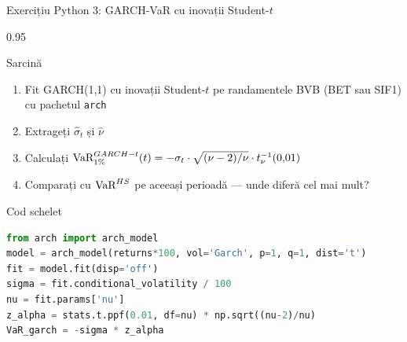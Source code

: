 \documentclass[9pt, aspectratio=169, t]{beamer}
\begin{document}
\begin{frame}[fragile,shrink=10]{Exercițiu Python 3: GARCH-VaR cu inovații Student-$t$}
\begin{cminipage}{0.95\textwidth}
    \begin{block}{Sarcină}
    \begin{enumerate}\setlength{\itemsep}{0pt}
        \item Fit GARCH(1,1) cu inovații Student-$t$ pe randamentele BVB (BET sau SIF1) cu pachetul \texttt{arch}
        \item Extrageți $\hat{\sigma}_t$ și $\hat{\nu}$
        \item Calculați $\text{VaR}^{GARCH-t}_{1\%}(t) = -\sigma_t \cdot \sqrt{(\nu-2)/\nu} \cdot t_\nu^{-1}(0{,}01)$
        \item Comparați cu $\text{VaR}^{HS}$ pe aceeași perioadă --- unde diferă cel mai mult?
    \end{enumerate}
    \end{block}
    \vspace{0.15cm}
    \begin{exampleblock}{Cod schelet}
\begin{lstlisting}[language=Python]
from arch import arch_model
model = arch_model(returns*100, vol='Garch', p=1, q=1, dist='t')
fit = model.fit(disp='off')
sigma = fit.conditional_volatility / 100
nu = fit.params['nu']
z_alpha = stats.t.ppf(0.01, df=nu) * np.sqrt((nu-2)/nu)
VaR_garch = -sigma * z_alpha
\end{lstlisting}
    \end{exampleblock}
\end{cminipage}
\end{frame}
\end{document}

